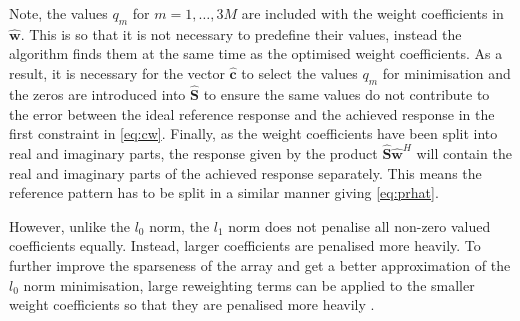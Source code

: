 \documentclass[10pt,final]{IEEEtran}
\begin{document}
Note, the values $q_{m}$ for $m=1, \ldots, 3M$ are included with the weight coefficients
in $\hat{\textbf{w}}$.  This is so that it is not necessary to predefine their values, instead the
algorithm finds them at the same time as the optimised weight coefficients.  As a result, it is necessary
for the vector $\hat{\textbf{c}}$ to select the values $q_{m}$ for minimisation and the zeros are introduced
into $\hat{\textbf{S}}$ to ensure the same values do not contribute to the error between the ideal reference
response and the achieved response in the first constraint in \eqref{eq:cw}.  Finally, as the weight
coefficients have been split into real and imaginary parts, the response given by the product
$\hat{\textbf{S}}\hat{\textbf{w}}^{H}$ will contain the real and imaginary parts of the achieved response
separately.  This means the reference pattern has to be split in a similar manner giving \eqref{eq:prhat}.

However, unlike the $l_{0}$ norm, the
$l_{1}$ norm does not penalise all non-zero valued coefficients
equally.  Instead, larger coefficients are penalised more heavily.
To further improve the sparseness of the array and get a better
approximation of the $l_{0}$ norm minimisation, large reweighting terms can be applied to the smaller weight coefficients so that they are penalised more heavily \cite{Hawes14c,Hawes14b,Candes08,Fuchs12,Prisco12}.
\end{document}
